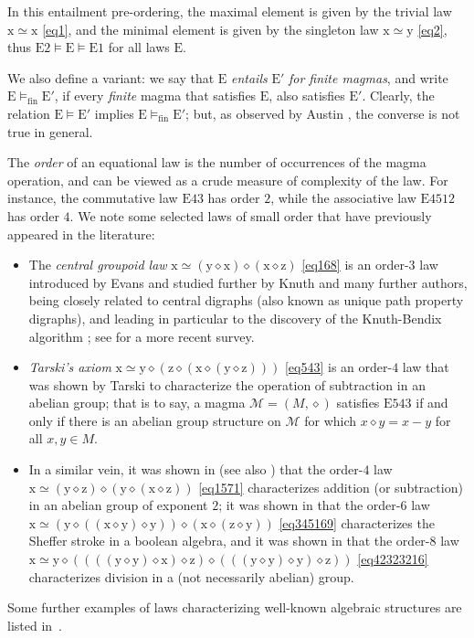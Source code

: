 \documentclass[12pt]{amsart}
\theoremstyle{definition}
\newcommand{\x}{\mathrm{x}}
\newcommand{\y}{\mathrm{y}}
\newcommand{\z}{\mathrm{z}}
\newcommand{\op}{\diamond}
\newcommand{\formaleq}{\simeq}
\newcommand{\modelsfin}{\models_{\mathrm{fin}}}
\newcommand{\Magma}{{\mathcal{M}}}
\newcommand{\Eq}[1]{\mathrm{E}#1}
\newcommand{\E}{\mathrm{E}}
\begin{document}
In this entailment pre-ordering, the maximal element is given by the trivial law $\x\formaleq\x$ \eqref{eq1}, and the minimal element is given by the singleton law $\x\formaleq \y$ \eqref{eq2}, thus $\Eq{2} \models {\E} \models \Eq{1}$ for all laws $\E$.

We also define a variant: we say that $\E$ \emph{entails} ${\E'}$ \emph{for finite magmas}, and write ${\E} \modelsfin {\E'}$, if every \emph{finite} magma that satisfies $\E$, also satisfies ${\E'}$.  Clearly, the relation ${\E} \models {\E'}$ implies ${\E} \modelsfin {\E'}$; but, as observed by Austin \cite{austin_finite}, the converse is not true in general.

The \emph{order} of an equational law is the number of occurrences of the magma operation, and can be viewed as a crude measure of complexity of the law. For instance, the commutative law $\Eq{43}$ has order $2$, while the associative law $\Eq{4512}$ has order $4$. We note some selected laws of small order that have previously appeared in the literature:
\begin{itemize}
\item The \emph{central groupoid law} $\x \formaleq (\y \op \x) \op (\x \op \z)$ \eqref{eq168} is an order-$3$ law introduced by Evans \cite{evans} and studied further by Knuth \cite{knuth} and many further authors, being closely related to central digraphs (also known as unique path property digraphs), and leading in particular to the discovery of the Knuth-Bendix algorithm \cite{knuth-bendix}; see \cite{klt} for a more recent survey.
\item \emph{Tarski's axiom} $\x \formaleq \y \op (\z \op (\x \op (\y \op \z)))$ \eqref{eq543} is an order-$4$ law that was shown by Tarski \cite{Tarski1938} to characterize the operation of subtraction in an abelian group; that is to say, a magma $\Magma = (M,\op)$ satisfies $\Eq{543}$ if and only if there is an abelian group structure on $\Magma$ for which $x \op y = x-y$ for all $x,y \in M$.
\item In a similar vein, it was shown in \cite{mendelsohn-padmanabhan} (see also \cite{meredith-prior}) that the order-$4$ law
$\x \formaleq (\y \op \z) \op (\y \op (\x \op \z))$ \eqref{eq1571} characterizes addition (or subtraction) in an abelian group of exponent $2$; it was shown in \cite{mccune_et_al} that the order-$6$ law $\x \formaleq (\y \op ((\x \op \y) \op \y)) \op (\x \op (\z \op \y))$ \eqref{eq345169} characterizes the Sheffer stroke in a boolean algebra, and it was shown in \cite{higman-neumann} that the order-$8$ law
$\x \formaleq \y \op ((((\y \op \y) \op \x) \op \z) \op (((\y \op \y) \op \y) \op \z))$ \eqref{eq42323216} characterizes division in a (not necessarily abelian) group.
\end{itemize}
Some further examples of laws characterizing well-known algebraic structures are listed in~\cite{mccune-survey}.
\end{document}
